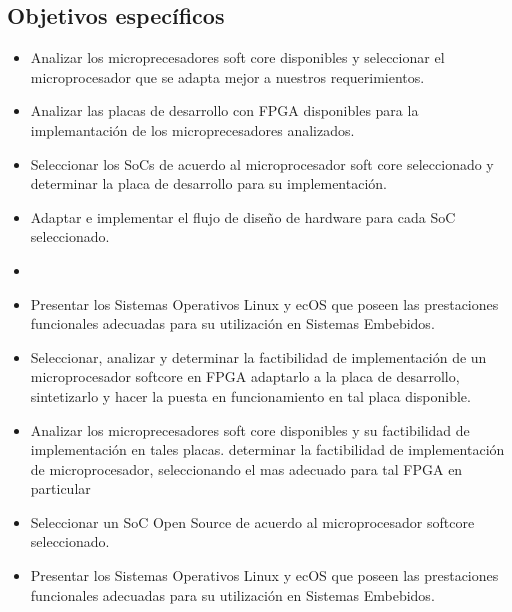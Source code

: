 \subsection{Objetivos específicos}
  \begin{itemize}
 \item Analizar los microprecesadores soft core disponibles y seleccionar el microprocesador que se adapta mejor a nuestros requerimientos.
 \item Analizar las placas de desarrollo con FPGA disponibles para la implemantación de los microprecesadores analizados.
  \item Seleccionar los SoCs de acuerdo al microprocesador soft core seleccionado y determinar la placa de desarrollo para su implementación.
\item Adaptar e implementar el flujo de diseño de hardware para cada SoC seleccionado. 
\item 
\item Presentar los Sistemas Operativos Linux y ecOS que poseen las prestaciones funcionales adecuadas para su utilización en Sistemas Embebidos.
 \end{itemize}



\begin{itemize}
\item Seleccionar, analizar y determinar la factibilidad de implementación de un microprocesador softcore en FPGA adaptarlo a la placa de desarrollo, sintetizarlo y hacer la puesta en funcionamiento en tal placa disponible.
\item Analizar los microprecesadores soft core disponibles y su factibilidad de implementación en tales placas. determinar la factibilidad de implementación de microprocesador, seleccionando el mas adecuado para tal FPGA en particular %
\item Seleccionar un SoC Open Source de acuerdo al microprocesador softcore seleccionado.
\item Presentar los Sistemas Operativos Linux y ecOS que poseen las prestaciones funcionales adecuadas para su utilización en Sistemas
Embebidos.
\end{itemize}

